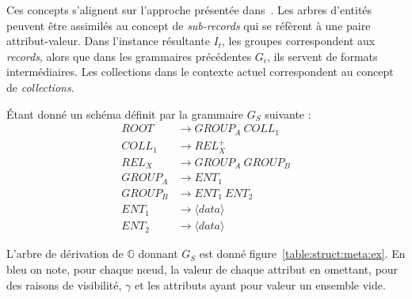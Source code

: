 Ces concepts s'alignent sur l'approche présentée dans~\cite{barretGenericAbstractionsData2021}.
Les arbres d'entités peuvent être assimilés au concept de \emph{sub-records} qui se réfèrent à une paire attribut-valeur.
Dans l'instance résultante $I_t$, les groupes correspondent aux \emph{records}, alors que dans les grammaires précédentes $G_i$, ils servent de formats intermédiaires.
Les collections dans le contexte actuel correspondent au concept de \emph{collections}.

\begin{example}
    Étant donné un schéma définit par la grammaire $G_S$ suivante :
    \begin{align*}
        ROOT    & \to GROUP_A ~ COLL_1     \\
        COLL_1  & \to REL_X^+              \\
        REL_X   & \to GROUP_A ~ GROUP_B    \\
        GROUP_A & \to ENT_1                \\
        GROUP_B & \to ENT_1 ~ ENT_2        \\
        ENT_1   & \to \langle data \rangle \\
        ENT_2   & \to \langle data \rangle
    \end{align*}

    L'arbre de dérivation de $\mathbb{G}$ donnant $G_S$ est donné figure~\ref{table:struct:meta:ex}.
    En bleu on note, pour chaque nœud, la valeur de chaque attribut en omettant, pour des raisons de visibilité, $\gamma$ et les attributs ayant pour valeur un ensemble vide.
\end{example}

